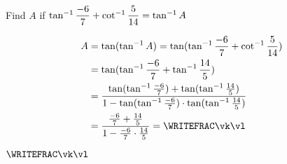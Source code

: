 



\FRACADD\va\vb\vd\vc\ve\vf
\FRACMULT\va\vb\vd\vc\vg\vh
{}\vg\vh\vi\vj
\FRACDIV\ve\vf\vi\vj\vk\vl

\question[1] Find $A$ if $\tan^{-1} \dfrac{-6}{7} + \cot^{-1}\dfrac{5}{14} = \tan^{-1} A$

\watchout

\begin{solution}[\halfpage]
	\begin{align}
      A &= \tan(\tan^{-1} A) = \tan(\tan^{-1}\frac\va\vb + \cot^{-1}\frac\vc\vd) \\ 
        &= \tan(\tan^{-1}\frac\va\vb + \tan^{-1}\frac\vd\vc) \\
        &= \dfrac{\tan(\tan^{-1}\frac\va\vb)+\tan(\tan^{-1}\frac\vd\vc)}
        {1-\tan(\tan^{-1}\frac\va\vb)\cdot\tan(\tan^{-1}\frac\vd\vc)} \\
        &= \dfrac{\frac\va\vb + \frac\vd\vc}{1-\frac\va\vb\cdot\frac\vd\vc} = \WRITEFRAC\vk\vl
	\end{align}
\end{solution}

\ifprintanswers
  \begin{codex}
    $\WRITEFRAC\vk\vl$
  \end{codex}
\fi 
